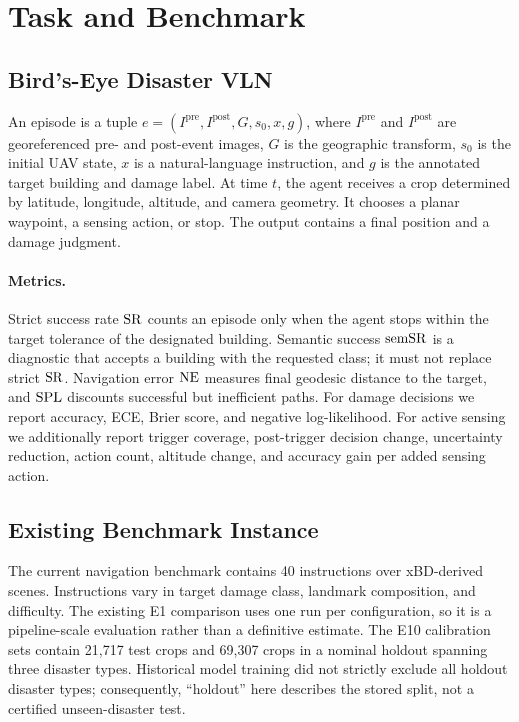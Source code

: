 \section{Task and Benchmark}
\label{sec:task}

\subsection{Bird's-Eye Disaster VLN}
An episode is a tuple
\(
e=(I^{\mathrm{pre}},I^{\mathrm{post}},G,s_0,x,g)
\),
where \(I^{\mathrm{pre}}\) and \(I^{\mathrm{post}}\) are georeferenced pre- and post-event images, \(G\) is the geographic transform, \(s_0\) is the initial UAV state, \(x\) is a natural-language instruction, and \(g\) is the annotated target building and damage label.
At time \(t\), the agent receives a crop determined by latitude, longitude, altitude, and camera geometry.
It chooses a planar waypoint, a sensing action, or stop.
The output contains a final position and a damage judgment.

\paragraph{Metrics.}
Strict success rate \(\mathrm{SR}\) counts an episode only when the agent stops within the target tolerance of the designated building.
Semantic success \(\mathrm{semSR}\) is a diagnostic that accepts a building with the requested class; it must not replace strict \(\mathrm{SR}\).
Navigation error \(\mathrm{NE}\) measures final geodesic distance to the target, and \(\mathrm{SPL}\) discounts successful but inefficient paths.
For damage decisions we report accuracy, ECE, Brier score, and negative log-likelihood.
For active sensing we additionally report trigger coverage, post-trigger decision change, uncertainty reduction, action count, altitude change, and accuracy gain per added sensing action.

\subsection{Existing Benchmark Instance}
The current navigation benchmark contains 40 instructions over xBD-derived scenes.
Instructions vary in target damage class, landmark composition, and difficulty.
The existing E1 comparison uses one run per configuration, so it is a pipeline-scale evaluation rather than a definitive estimate.
The E10 calibration sets contain 21,717 test crops and 69,307 crops in a nominal holdout spanning three disaster types.
Historical model training did not strictly exclude all holdout disaster types; consequently, ``holdout'' here describes the stored split, not a certified unseen-disaster test.

